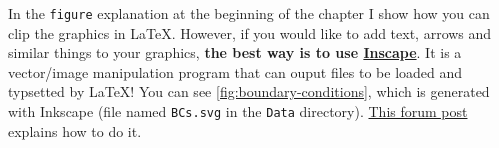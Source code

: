 In the \verb|figure| explanation at the beginning of the chapter I show how you can clip the graphics in \LaTeX. However, if you would like to add text, arrows and similar things to your graphics, \textbf{the best way is to use \href{https://inkscape.org/}{Inscape}}. It is a vector/image manipulation program that can ouput files to be loaded and typsetted by \LaTeX! You can see \cref{fig:boundary-conditions}, which is generated with Inkscape (file named \texttt{BCs.svg} in the \texttt{Data} directory). \href{https://tex.stackexchange.com/questions/151232/exporting-from-inkscape-to-latex-via-tikz}{This forum post} explains how to do it.

